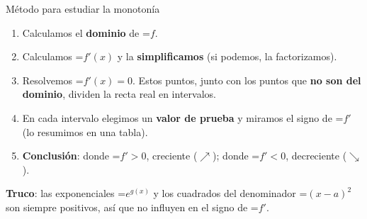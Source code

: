 \documentclass[11pt,a4paper]{article}
\newcommand{\lt}{<}\newcommand{\gt}{>}
\newcommand{\fmm}[1]{\setbox0=\hbox{$#1$}\ifdim\wd0>\linewidth\[#1\]\else\mbox{\box0}\fi}
\newcommand{\fmuline}[1]{\textbf{\color{fmaccent}#1}}
\begin{document}
  
\begin{fmdef}{Método para estudiar la monotonía}
\begin{enumerate}
\item Calculamos el \textbf{dominio} de \fmm{f}.
\item Calculamos \fmm{f'(x)} y la \textbf{simplificamos} (si podemos, la factorizamos).
\item Resolvemos \fmm{f'(x)=0}. Estos puntos, junto con los puntos que \textbf{no son del dominio}, dividen la recta real en intervalos.
\item En cada intervalo elegimos un \textbf{valor de prueba} y miramos el signo de \fmm{f'} (lo resumimos en una tabla).
\item \textbf{Conclusión}: donde \fmm{f'\gt0}, creciente ($\nearrow$); donde \fmm{f'\lt0}, decreciente ($\searrow$).
\end{enumerate}

      
\begin{fmnote}\fmuline{Truco}: las exponenciales \fmm{e^{g(x)}} y los cuadrados del denominador \fmm{(x-a)^2} son siempre positivos, así que no influyen en el signo de \fmm{f'}.\end{fmnote}
\end{fmdef}
\end{document}
